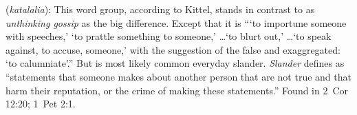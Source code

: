 \item[Slander,]

(\textit{katalalia}):
This word group, according to Kittel, stands in contrast to  as \emph{unthinking gossip} as the big difference. Except that it is ```to importune someone with speeches,' `to prattle something to someone,' \ldots `to blurt out,' \ldots `to speak against, to accuse, someone,' with the suggestion of the false and exaggregated: `to calumniate'.''
 But is most likely common everyday slander. \emph{Slander} defines as ``statements that someone makes about another person that are not true and that harm their reputation, or the crime of making these statements.''
Found in 2~Cor 12:20; 1~Pet 2:1.
